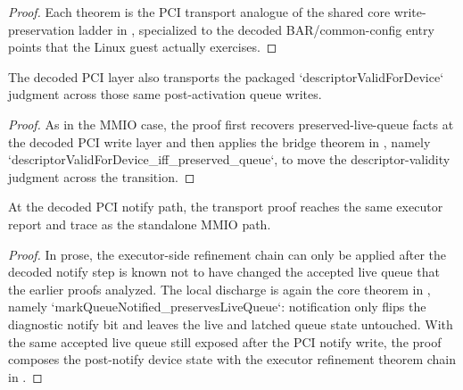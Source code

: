 \begin{proof}
\leanok
{}
Each theorem is the PCI transport analogue of the shared core write-preservation ladder in , specialized to the decoded BAR/common-config entry points that the Linux guest actually exercises.
\end{proof}

\begin{theorem}
\label{thm:pci-descriptor-validity}
\leanok
The decoded PCI layer also transports the packaged `descriptorValidForDevice` judgment across those same post-activation queue writes.
\end{theorem}

\begin{proof}
\leanok
{}
As in the MMIO case, the proof first recovers preserved-live-queue facts at the decoded PCI write layer and then applies the bridge theorem in , namely `descriptorValidForDevice_iff_preserved_queue`, to move the descriptor-validity judgment across the transition.
\end{proof}

\begin{theorem}
\label{thm:pci-notify-refinement}
\leanok
At the decoded PCI notify path, the transport proof reaches the same executor report and trace as the standalone MMIO path.
\end{theorem}

\begin{proof}
\leanok
{}
In prose, the executor-side refinement chain can only be applied after the decoded notify step is known not to have changed the accepted live queue that the earlier proofs analyzed.
The local discharge is again the core theorem in , namely `markQueueNotified_preservesLiveQueue`: notification only flips the diagnostic notify bit and leaves the live and latched queue state untouched.
With the same accepted live queue still exposed after the PCI notify write, the proof composes the post-notify device state with the executor refinement theorem chain in .
\end{proof}

